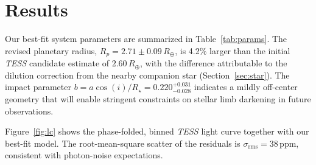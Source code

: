 \section{Results}
\label{sec:results}

Our best-fit system parameters are summarized in Table~\ref{tab:params}.
The revised planetary radius, $R_p = 2.71 \pm 0.09\,R_\oplus$, is
4.2\% larger than the initial \textit{TESS} candidate estimate of
$2.60\,R_\oplus$, with the difference attributable to the dilution
correction from the nearby companion star (Section~\ref{sec:star}).
The impact parameter $b = a\cos(i)/R_\star = 0.220^{+0.031}_{-0.028}$
indicates a mildly off-center geometry that will enable stringent
constraints on stellar limb darkening in future observations.

Figure~\ref{fig:lc} shows the phase-folded, binned \textit{TESS}
light curve together with our best-fit model.  The root-mean-square
scatter of the residuals is $\sigma_\mathrm{rms} = 38\,\mathrm{ppm}$,
consistent with photon-noise expectations.

